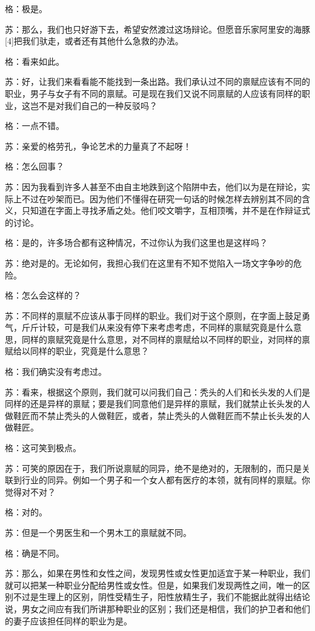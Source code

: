 \documentclass[12pt,oneside]{book}
\begin{document}
格：极是。

苏：那么，我们也只好游下去，希望安然渡过这场辩论。但愿音乐家阿里安的海豚[4]把我们驮走，或者还有其他什么急救的办法。

格：看来如此。

苏：好，让我们来看看能不能找到一条出路。我们承认过不同的禀赋应该有不同的职业，男子与女子有不同的禀赋。可是现在我们又说不同禀赋的人应该有同样的职业，这岂不是对我们自己的一种反驳吗？

格：一点不错。

苏：亲爱的格劳孔，争论艺术的力量真了不起呀！

格：怎么回事？

苏：因为我看到许多人甚至不由自主地跌到这个陷阱中去，他们以为是在辩论，实际上不过在吵架而已。因为他们不懂得在研究一句话的时候怎样去辨别其不同的含义，只知道在字面上寻找矛盾之处。他们咬文嚼字，互相顶嘴，并不是在作辩证式的讨论。

格：是的，许多场合都有这种情况，不过你认为我们这里也是这样吗？

苏：绝对是的。无论如何，我担心我们在这里有不知不觉陷入一场文字争吵的危险。

格：怎么会这样的？

苏：不同样的禀赋不应该从事于同样的职业。我们对于这个原则，在字面上鼓足勇气，斤斤计较，可是我们从来没有停下来考虑考虑，不同样的禀赋究竟是什么意思，同样的禀赋究竟是什么意思，对不同样的禀赋给以不同样的职业，对同样的禀赋给以同样的职业，究竟是什么意思？

格：我们确实没有考虑过。

苏：看来，根据这个原则，我们就可以问我们自己：秃头的人们和长头发的人们是同样的还是异样的禀赋；要是我们同意他们是异样的禀赋，我们就禁止长头发的人做鞋匠而不禁止秃头的人做鞋匠，或者，禁止秃头的人做鞋匠而不禁止长头发的人做鞋匠。

格：这可笑到极点。

苏：可笑的原因在于，我们所说禀赋的同异，绝不是绝对的，无限制的，而只是关联到行业的同异。例如一个男子和一个女人都有医疗的本领，就有同样的禀赋。你觉得对不对？

格：对的。

苏：但是一个男医生和一个男木工的禀赋就不同。

格：确是不同。

苏：那么，如果在男性和女性之间，发现男性或女性更加适宜于某一种职业，我们就可以把某一种职业分配给男性或女性。但是，如果我们发现两性之间，唯一的区别不过是生理上的区别，阴性受精生子，阳性放精生子，我们不能据此就得出结论说，男女之间应有我们所讲那种职业的区别；我们还是相信，我们的护卫者和他们的妻子应该担任同样的职业为是。
\end{document}
